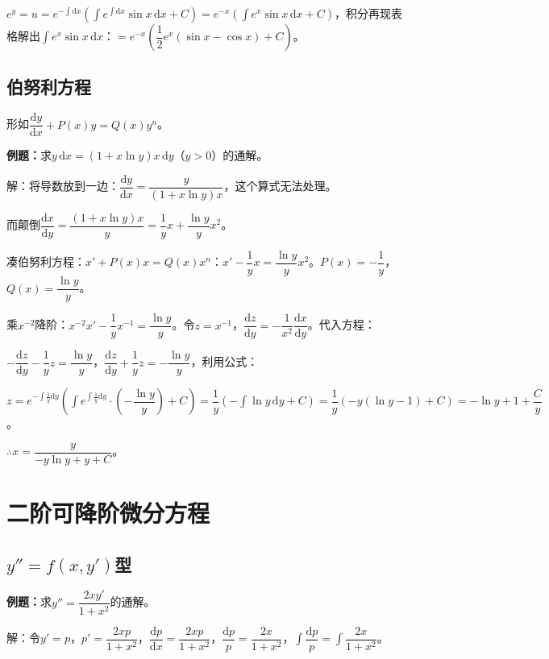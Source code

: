 \documentclass[UTF8, 12pt]{ctexart}
\begin{document}
$e^y=u=e^{-\int\textrm{d}x}(\int e^{\int\textrm{d}x}\sin x\,\textrm{d}x+C)=e^{-x}(\int e^x\sin x\,\textrm{d}x+C)$，积分再现表格解出$\int e^x\sin x\,\textrm{d}x$：$=e^{-x}\left(\dfrac{1}{2}e^x(\sin x-\cos x)+C\right)$。

\subsection{伯努利方程}

形如$\dfrac{\textrm{d}y}{\textrm{d}x}+P(x)y=Q(x)y^n$。

\textbf{例题：}求$y\,\textrm{d}x=(1+x\ln y)x\,\textrm{d}y$（$y>0$）的通解。

解：将导数放到一边：$\dfrac{\textrm{d}y}{\textrm{d}x}=\dfrac{y}{(1+x\ln y)x}$，这个算式无法处理。

而颠倒$\dfrac{\textrm{d}x}{\textrm{d}y}=\dfrac{(1+x\ln y)x}{y}=\dfrac{1}{y}x+\dfrac{\ln y}{y}x^2$。

凑伯努利方程：$x'+P(x)x=Q(x)x^n$：$x'-\dfrac{1}{y}x=\dfrac{\ln y}{y}x^2$。$P(x)=-\dfrac{1}{y}$，$Q(x)=\dfrac{\ln y}{y}$。

乘$x^{-2}$降阶：$x^{-2}x'-\dfrac{1}{y}x^{-1}=\dfrac{\ln y}{y}$。令$z=x^{-1}$，$\dfrac{\textrm{d}z}{\textrm{d}y}=-\dfrac{1}{x^2}\dfrac{\textrm{d}x}{\textrm{d}y}$。代入方程：

$-\dfrac{\textrm{d}z}{\textrm{d}y}-\dfrac{1}{y}z=\dfrac{\ln y}{y}$，$\dfrac{\textrm{d}z}{\textrm{d}y}+\dfrac{1}{y}z=-\dfrac{\ln y}{y}$，利用公式：

$z=e^{-\int\frac{1}{y}\textrm{d}y}\left(\displaystyle{\int e^{\int\frac{1}{y}\textrm{d}y}\cdot\left(-\dfrac{\ln y}{y}\right)+C}\right)=\dfrac{1}{y}(-\int\ln y\,\textrm{d}y+C)=\dfrac{1}{y}(-y(\ln y-1)+C)=-\ln y+1+\dfrac{C}{y}$。

$\therefore x=\dfrac{y}{-y\ln y+y+C}$。

\section{二阶可降阶微分方程}

\subsection{\texorpdfstring{$y''=f(x,y')$}\ 型}

\textbf{例题：}求$y''=\dfrac{2xy'}{1+x^2}$的通解。

解：令$y'=p$，$p'=\dfrac{2xp}{1+x^2}$，$\dfrac{\textrm{d}p}{\textrm{d}x}=\dfrac{2xp}{1+x^2}$，$\dfrac{\textrm{d}p}{p}=\dfrac{2x}{1+x^2}$，$\displaystyle{\int\dfrac{\textrm{d}p}{p}=\int\dfrac{2x}{1+x^2}}$。
\end{document}
